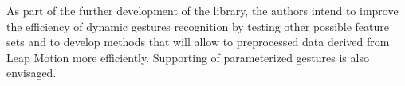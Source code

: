 As part of the further development of the library, the authors intend to improve the efficiency of dynamic gestures recognition by testing other possible feature sets and to develop methods that will allow to preprocessed data derived from Leap Motion more efficiently. Supporting of parameterized gestures is also envisaged.

